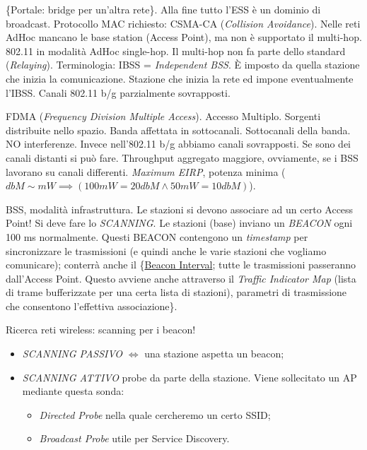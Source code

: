 \{Portale: bridge per un'altra rete\}. Alla fine tutto l'ESS è un dominio di broadcast. Protocollo MAC richiesto: CSMA-CA (\textit{Collision Avoidance}).
Nelle reti AdHoc mancano le base station (Access Point), ma non è supportato il multi-hop. 802.11 in modalità AdHoc single-hop. Il multi-hop non fa parte dello standard (\textit{Relaying}). Terminologia:
IBSS = \textit{Independent BSS}. \`E imposto da quella stazione che inizia la comunicazione. Stazione che inizia la rete ed impone eventualmente l'IBSS. Canali 802.11 b/g parzialmente sovrapposti.

FDMA (\textit{Frequency Division Multiple Access}). Accesso Multiplo. Sorgenti distribuite nello spazio. Banda affettata in sottocanali. Sottocanali della banda. NO interferenze. Invece nell'802.11 b/g abbiamo canali sovrapposti. Se sono dei canali distanti si può fare. Throughput aggregato maggiore, ovviamente, se i BSS lavorano su canali differenti. \textit{Maximum EIRP}, potenza minima ($dbM \sim mW \implies (100 mW = 20 dbM \land 50 mW = 10dbM)$).

BSS, modalità infrastruttura. Le stazioni si devono associare ad un certo Access Point! Si deve fare lo \textit{SCANNING}. Le stazioni (base) inviano un \textit{BEACON} ogni 100 ms normalmente. Questi BEACON contengono un \textit{timestamp} per sincronizzare le trasmissioni (e quindi anche le varie stazioni che vogliamo comunicare); conterrà anche il \{\underline{Beacon Interval}; tutte le trasmissioni passeranno dall'Access Point. Questo avviene anche attraverso il \textit{Traffic Indicator Map} (lista di trame bufferizzate per una certa lista di stazioni), parametri di trasmissione che consentono l'effettiva associazione\}.

Ricerca reti wireless: scanning per i beacon!

\begin{itemize}

\item{\textit{SCANNING PASSIVO}} $\iff$ una stazione aspetta un beacon;
\item{\textit{SCANNING ATTIVO}} probe da parte della stazione. Viene sollecitato un AP mediante questa sonda: 

\begin{itemize}

\item{\textit{Directed Probe}} nella quale cercheremo un certo SSID;
\item{\textit{Broadcast Probe}} utile per Service Discovery.
\end{itemize}

\end{itemize}

